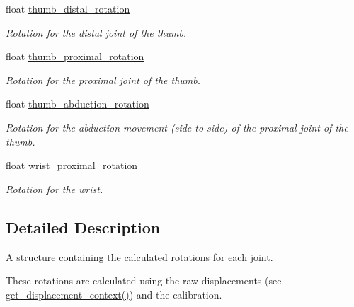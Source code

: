 \begin{DoxyCompactItemize}
float \hyperlink{struct_rotation_context_a1c439291c0fbae6cda389e2baa11e60f}{thumb\+\_\+distal\+\_\+rotation}
\begin{DoxyCompactList}\small\item\em Rotation for the distal joint of the thumb. \end{DoxyCompactList}\item 
\mbox{\label{struct_rotation_context_a821637ce6e1cf577c19e1553eaa011ef}} 
float \hyperlink{struct_rotation_context_a821637ce6e1cf577c19e1553eaa011ef}{thumb\+\_\+proximal\+\_\+rotation}
\begin{DoxyCompactList}\small\item\em Rotation for the proximal joint of the thumb. \end{DoxyCompactList}\item 
\mbox{\label{struct_rotation_context_a5a5776cc64bcafc497b7ad1d5bb1a087}} 
float \hyperlink{struct_rotation_context_a5a5776cc64bcafc497b7ad1d5bb1a087}{thumb\+\_\+abduction\+\_\+rotation}
\begin{DoxyCompactList}\small\item\em Rotation for the abduction movement (side-\/to-\/side) of the proximal joint of the thumb. \end{DoxyCompactList}\item 
\mbox{\label{struct_rotation_context_a3bd5cfd0ae94e5e84d5d3a2c5ebb6410}} 
float \hyperlink{struct_rotation_context_a3bd5cfd0ae94e5e84d5d3a2c5ebb6410}{wrist\+\_\+proximal\+\_\+rotation}
\begin{DoxyCompactList}\small\item\em Rotation for the wrist. \end{DoxyCompactList}\end{DoxyCompactItemize}


\subsection{Detailed Description}
A structure containing the calculated rotations for each joint. 

These rotations are calculated using the raw displacements (see {\ttfamily \hyperlink{group__displacement_access_ga26563f1c104bd9a0d80ab8c0afd1e8bd}{get\+\_\+displacement\+\_\+context()}}) and the calibration. 